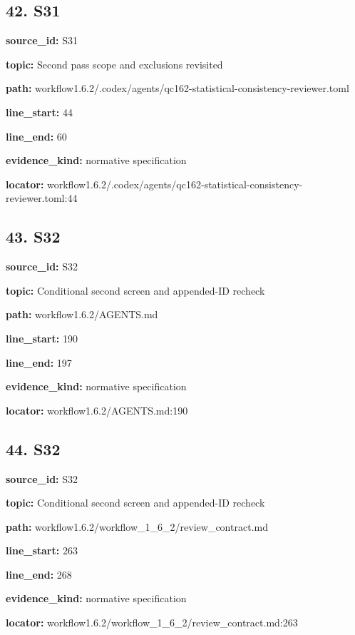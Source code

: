 \documentclass[10pt,a4paper]{article}
\begin{document}
\subsection*{42.\allowbreak{} S31}
\textbf{source\_\allowbreak{}id:} S31\par
\textbf{topic:} Second pass scope and exclusions revisited\par
\textbf{path:} workflow1.\allowbreak{}6.\allowbreak{}2/\allowbreak{}.\allowbreak{}codex/\allowbreak{}agents/\allowbreak{}qc162-\allowbreak{}statistical-\allowbreak{}consistency-\allowbreak{}reviewer.\allowbreak{}toml\par
\textbf{line\_\allowbreak{}start:} 44\par
\textbf{line\_\allowbreak{}end:} 60\par
\textbf{evidence\_\allowbreak{}kind:} normative specification\par
\textbf{locator:} workflow1.\allowbreak{}6.\allowbreak{}2/\allowbreak{}.\allowbreak{}codex/\allowbreak{}agents/\allowbreak{}qc162-\allowbreak{}statistical-\allowbreak{}consistency-\allowbreak{}reviewer.\allowbreak{}toml:44\par
\subsection*{43.\allowbreak{} S32}
\textbf{source\_\allowbreak{}id:} S32\par
\textbf{topic:} Conditional second screen and appended-\allowbreak{}ID recheck\par
\textbf{path:} workflow1.\allowbreak{}6.\allowbreak{}2/\allowbreak{}AGENTS.\allowbreak{}md\par
\textbf{line\_\allowbreak{}start:} 190\par
\textbf{line\_\allowbreak{}end:} 197\par
\textbf{evidence\_\allowbreak{}kind:} normative specification\par
\textbf{locator:} workflow1.\allowbreak{}6.\allowbreak{}2/\allowbreak{}AGENTS.\allowbreak{}md:190\par
\subsection*{44.\allowbreak{} S32}
\textbf{source\_\allowbreak{}id:} S32\par
\textbf{topic:} Conditional second screen and appended-\allowbreak{}ID recheck\par
\textbf{path:} workflow1.\allowbreak{}6.\allowbreak{}2/\allowbreak{}workflow\_\allowbreak{}1\_\allowbreak{}6\_\allowbreak{}2/\allowbreak{}review\_\allowbreak{}contract.\allowbreak{}md\par
\textbf{line\_\allowbreak{}start:} 263\par
\textbf{line\_\allowbreak{}end:} 268\par
\textbf{evidence\_\allowbreak{}kind:} normative specification\par
\textbf{locator:} workflow1.\allowbreak{}6.\allowbreak{}2/\allowbreak{}workflow\_\allowbreak{}1\_\allowbreak{}6\_\allowbreak{}2/\allowbreak{}review\_\allowbreak{}contract.\allowbreak{}md:263\par
\end{document}
